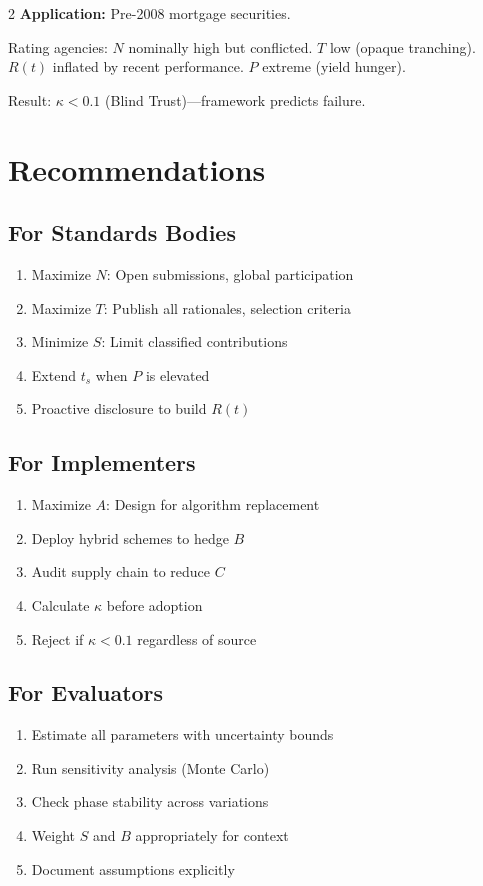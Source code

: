 \documentclass[11pt]{article}
\begin{document}
\begin{multicols}{2}
\textbf{Application:} Pre-2008 mortgage securities.

Rating agencies: $N$ nominally high but conflicted. $T$ low (opaque tranching). $R(t)$ inflated by recent performance. $P$ extreme (yield hunger).

Result: $\kappa < 0.1$ (Blind Trust)---framework predicts failure.

\section{Recommendations}

\subsection{For Standards Bodies}

\begin{enumerate}[noitemsep]
\item Maximize $N$: Open submissions, global participation
\item Maximize $T$: Publish all rationales, selection criteria
\item Minimize $S$: Limit classified contributions
\item Extend $t_s$ when $P$ is elevated
\item Proactive disclosure to build $R(t)$
\end{enumerate}

\subsection{For Implementers}

\begin{enumerate}[noitemsep]
\item Maximize $A$: Design for algorithm replacement
\item Deploy hybrid schemes to hedge $B$
\item Audit supply chain to reduce $C$
\item Calculate $\kappa$ before adoption
\item Reject if $\kappa < 0.1$ regardless of source
\end{enumerate}

\subsection{For Evaluators}

\begin{enumerate}[noitemsep]
\item Estimate all parameters with uncertainty bounds
\item Run sensitivity analysis (Monte Carlo)
\item Check phase stability across variations
\item Weight $S$ and $B$ appropriately for context
\item Document assumptions explicitly
\end{enumerate}


\end{multicols}
\end{document}
